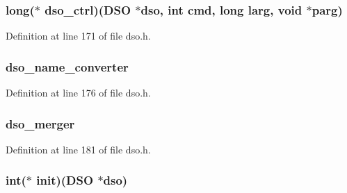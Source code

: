 \subsubsection[{\texorpdfstring{dso\+\_\+ctrl}{dso_ctrl}}]{\setlength{\rightskip}{0pt plus 5cm}long($\ast$ dso\+\_\+ctrl)({\bf D\+SO} $\ast$dso, int cmd, long larg, {\bf void} $\ast$parg)}\hypertarget{structdso__meth__st_a36f7607306424da4b5e07ae1a44bb49a}{}\label{structdso__meth__st_a36f7607306424da4b5e07ae1a44bb49a}


Definition at line 171 of file dso.\+h.

\subsubsection[{\texorpdfstring{dso\+\_\+name\+\_\+converter}{dso_name_converter}}]{ dso\+\_\+name\+\_\+converter}\hypertarget{structdso__meth__st_a8ec168f1df62d7c10f193f2736bc1921}{}\label{structdso__meth__st_a8ec168f1df62d7c10f193f2736bc1921}


Definition at line 176 of file dso.\+h.

\subsubsection[{\texorpdfstring{dso\+\_\+merger}{dso_merger}}]{ dso\+\_\+merger}\hypertarget{structdso__meth__st_aab7aa77e5c3fe1f02d6f89f24df0720b}{}\label{structdso__meth__st_aab7aa77e5c3fe1f02d6f89f24df0720b}


Definition at line 181 of file dso.\+h.

\subsubsection[{\texorpdfstring{init}{init}}]{\setlength{\rightskip}{0pt plus 5cm}int($\ast$ init)({\bf D\+SO} $\ast$dso)}\hypertarget{structdso__meth__st_a1d0ccf624078ee2ba092a714e209378c}{}\label{structdso__meth__st_a1d0ccf624078ee2ba092a714e209378c}


